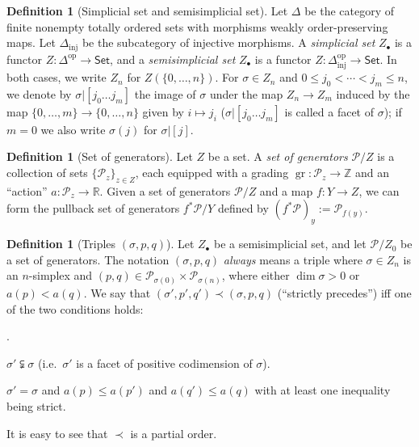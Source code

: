\documentclass[12pt]{article}
\theoremstyle{definition}
\newtheorem{definition}[theorem]{Definition}
\theoremstyle{remark}
\numberwithin{equation}{subsection}
\newcommand{\ZZ}{\mathbb Z}
\newcommand{\RR}{\mathbb R}
\newcommand{\PPP}{\mathcal P}
\newcommand{\Set}{\mathsf{Set}}
\newcommand{\op}{\mathrm{op}}
\newcommand{\inj}{\mathrm{inj}}
\newcommand{\gr}{\operatorname{gr}}
\newcounter{rcounti}
\newenvironment{rlist}{\begin{list}{\roman{rcounti}.}{\usecounter{rcounti}
\setlength\itemsep{0pt}
\setlength\labelsep{4pt}
\setlength\labelwidth{16pt}
\setlength\leftmargin{32pt}
\setlength\listparindent{0pt}
\setlength\parsep{0pt}
\setlength\parskip{0pt}
\setlength\partopsep{0pt}
\setlength\rightmargin{0pt}
\setlength\topsep{0pt}
\setlength\itemindent{0pt}
}}{\end{list}}
\begin{document}
\begin{definition}[Simplicial set and semisimplicial set]
Let $\Delta$ be the category of finite nonempty totally ordered sets with morphisms weakly order-preserving maps.  Let $\Delta_\inj$ be the subcategory of injective morphisms.  A \emph{simplicial set} $Z_\bullet$ is a functor $Z:\Delta^\op\to\Set$, and a \emph{semisimplicial set} $Z_\bullet$ is a functor $Z:\Delta_\inj^\op\to\Set$.  In both cases, we write $Z_n$ for $Z(\{0,\ldots,n\})$.  For $\sigma\in Z_n$ and $0\leq j_0<\cdots<j_m\leq n$, we denote by $\sigma|[j_0\ldots j_m]$ the image of $\sigma$ under the map $Z_n\to Z_m$ induced by the map $\{0,\ldots,m\}\to\{0,\ldots,n\}$ given by $i\mapsto j_i$ ($\sigma|[j_0\ldots j_m]$ is called a facet of $\sigma$); if $m=0$ we also write $\sigma(j)$ for $\sigma|[j]$.
\end{definition}

\begin{definition}[Set of generators]
Let $Z$ be a set.  A \emph{set of generators} $\PPP/Z$ is a collection of sets $\{\PPP_z\}_{z\in Z}$, each equipped with a grading $\gr:\PPP_z\to\ZZ$ and an ``action'' $a:\PPP_z\to\RR$.  Given a set of generators $\PPP/Z$ and a map $f:Y\to Z$, we can form the pullback set of generators $f^\ast\PPP/Y$ defined by $(f^\ast\PPP)_y:=\PPP_{f(y)}$.
\end{definition}

\begin{definition}[Triples $(\sigma,p,q)$]
Let $Z_\bullet$ be a semisimplicial set, and let $\PPP/Z_0$ be a set of generators.  The notation $(\sigma,p,q)$ \emph{always} means a triple where $\sigma\in Z_n$ is an $n$-simplex and $(p,q)\in\PPP_{\sigma(0)}\times\PPP_{\sigma(n)}$, where either $\dim\sigma>0$ or $a(p)<a(q)$.  We say that $(\sigma',p',q')\prec(\sigma,p,q)$ (``strictly precedes'') iff one of the two conditions holds:
\begin{rlist}
\item$\sigma'\subsetneqq\sigma$ (i.e.\ $\sigma'$ is a facet of positive codimension of $\sigma$).
\item$\sigma'=\sigma$ and $a(p)\leq a(p')$ and $a(q')\leq a(q)$ with at least one inequality being strict.
\end{rlist}
It is easy to see that $\prec$ is a partial order.
\end{definition}
\end{document}
